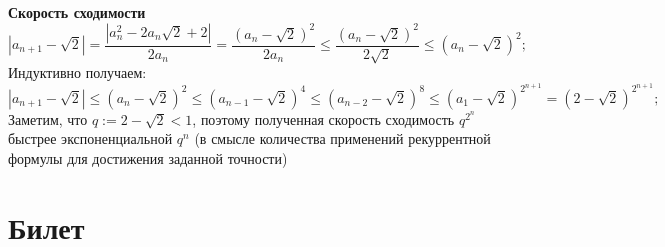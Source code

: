 \documentclass[12pt,a4paper]{article}
\begin{document}
\begin{itemize}
	\textbf{Скорость сходимости}
	\[
	|a_{n+1} - \sqrt2| = \frac{|a_{n}^2 - 2a_n\sqrt2 + 2|}{2a_n} = \frac{(a_n - \sqrt2)^2}{2a_n} \leq  \frac{(a_n - \sqrt2)^2}{2\sqrt2} \leq (a_n - \sqrt2)^2;
	\]
	Индуктивно получаем:
	\[
	|a_{n+1} - \sqrt2| \leq (a_n - \sqrt2)^2 \leq (a_{n-1} - \sqrt2)^4 \leq (a_{n-2} - \sqrt2)^8 \leq (a_1 - \sqrt2)^{2^{n+1}} = (2-\sqrt2)^{2^{n+1}};	
	\]
	Заметим, что $q := 2 - \sqrt2 < 1$, поэтому полученная скорость сходимость $q^{2^n}$ быстрее экспоненциальной $q^n$ (в смысле количества применений рекуррентной формулы для достижения заданной точности)

\end{itemize}

\section{Билет}
\end{document}
